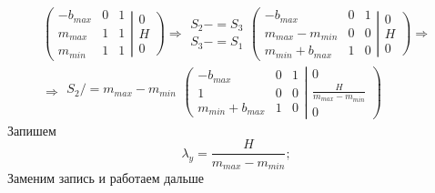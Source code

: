 $$
\begin{gathered}
	\left(
		\begin{array}{ccc}
			-b_{max} & 0 & 1 \\
			m_{max} & 1 & 1 \\
			m_{min} & 1 & 1
		\end{array}
		\right.
		\left|
		\begin{array}{c}
			0 \\ H \\ 0
		\end{array}
	\right)
	\Rightarrow
	\begin{array}{c}
		S_2-=S_3\\
		S_3-=S_1
	\end{array}
	\left(
		\begin{array}{ccc}
			-b_{max} & 0 & 1 \\
			m_{max} - m_{min} & 0 & 0 \\
			m_{min} + b_{max} & 1 & 0
		\end{array}
		\right.
		\left|
		\begin{array}{c}
			0 \\ H \\ 0
		\end{array}
	\right)
	\Rightarrow\\
	\Rightarrow
	\begin{array}{c}
		S_2/=m_{max} - m_{min}\\
	\end{array}
	\left(
		\begin{array}{ccc}
			-b_{max} & 0 & 1 \\
			1 & 0 & 0 \\
			m_{min} + b_{max} & 1 & 0
		\end{array}
		\right.
		\left|
		\begin{array}{c}
			0 \\ \frac{H}{m_{max} - m_{min}} \\ 0
		\end{array}
	\right)
\end{gathered}
$$
Запишем
$$\lambda_y = \frac{H}{m_{max} - m_{min}};$$
Заменим запись и работаем дальше
